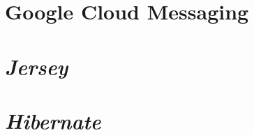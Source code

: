 	\section{\textbf{Google Cloud 	Messaging}}
		
	
	\section{\textit{Jersey}}
		
	
	\section{\textit{Hibernate}}
		

%
%
	



				





